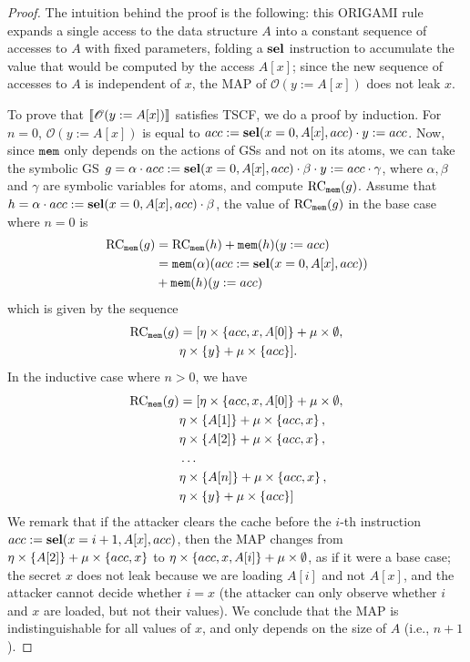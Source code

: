 \begin{proof}
    The intuition behind the proof is the following: this ORIGAMI rule expands a single access to the data structure $A$ into a constant sequence of accesses to $A$ with fixed parameters, folding a $\textbf{sel}$ instruction to accumulate the value that would be computed by the access $A[x]$; since the new sequence of accesses to $A$ is independent of $x$, the MAP of $\mathscr{O}(y:=A[x])$ does not leak $x$. 

    To prove that $\llbracket \mathscr{O}(y:=A[x])\rrbracket$ satisfies TSCF, we do a proof by induction.
    For $n=0$, $\mathscr{O}(y:=A[x])$ is equal to $acc:=\textbf{sel}(x=0,A[x],acc)\cdot y:=acc$. Now, since $\texttt{mem}$ only depends on the actions of GSs and not on its atoms, we can take the symbolic GS $g=\alpha\cdot acc:=\textbf{sel}(x=0,A[x],acc)\cdot \beta \cdot y:=acc\cdot \gamma$, where $\alpha, \beta$ and $\gamma$ are symbolic variables for atoms, and compute $\text{RC}_{\texttt{mem}}(g)$. Assume that $h=\alpha\cdot acc:=\textbf{sel}(x=0,A[x],acc)\cdot \beta$,  the value of $\text{RC}_{\texttt{mem}}(g)$ in the base case where $n=0$ is
    \begin{align*}
        \text{RC}_{\texttt{mem}}(g)&=\text{RC}_{\texttt{mem}}(h)+\texttt{mem}(h)(y:=acc) \\
        &=\texttt{mem}(\alpha)(acc:=\textbf{sel}(x=0,A[x],acc))\\
        &+\texttt{mem}(h)(y:=acc)
    \end{align*}
which is given by the sequence
    \begin{align*}
        \text{RC}_{\texttt{mem}}(g)&=[\eta\times\left\{acc,x,A[0]\right\}+\mu\times \emptyset,\\
        &\eta\times\left\{y\right\}+\mu\times\left\{acc\right\}].
    \end{align*}
In the inductive case where $n>0$, we have
    \begin{align*}
        \text{RC}_{\texttt{mem}}(g)&=[\eta\times\left\{acc,x,A[0]\right\}+\mu\times \emptyset,\\
        &\eta\times\left\{A[1]\right\}+\mu\times \left\{acc,x\right\},\\
        &\eta\times\left\{A[2]\right\}+\mu\times \left\{acc,x\right\},\\
        &\ldots\\
        &\eta\times\left\{A[n]\right\}+\mu\times \left\{acc,x\right\},\\
        &\eta\times\left\{y\right\}+\mu\times\left\{acc\right\}]
    \end{align*}
We remark that if the attacker clears the cache before the $i$-th instruction $acc:=\textbf{sel}(x=i+1,A[x],acc)$, then the MAP changes from $\eta\times\left\{A[2]\right\}+\mu\times \left\{acc,x\right\}$ to $\eta\times\left\{acc,x,A[i]\right\}+\mu\times \emptyset$, as if it were a base case; the secret $x$ does not leak because we are loading $A[i]$ and not $A[x]$, and the attacker cannot decide whether $i=x$ (the attacker can only observe whether $i$ and $x$ are loaded, but not their values). We conclude that the MAP is indistinguishable for all values of $x$, and only depends on the size of $A$ (i.e., $n+1$). 

\end{proof}

